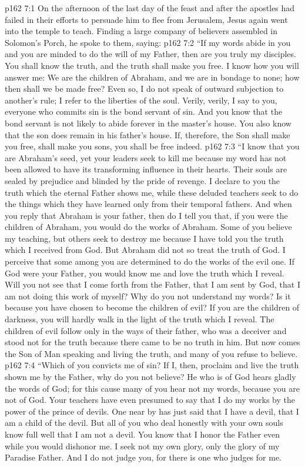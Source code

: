 \vs p162 7:1 On the afternoon of the last day of the feast and after the apostles had failed in their efforts to persuade him to flee from Jerusalem, Jesus again went into the temple to teach. Finding a large company of believers assembled in Solomon’s Porch, he spoke to them, saying:
\pc \vs p162 7:2 “If my words abide in you and you are minded to do the will of my Father, then are you truly my disciples. You shall know the truth, and the truth shall make you free. I know how you will answer me: We are the children of Abraham, and we are in bondage to none; how then shall we be made free? Even so, I do not speak of outward subjection to another’s rule; I refer to the liberties of the soul. Verily, verily, I say to you, everyone who commits sin is the bond servant of sin. And you know that the bond servant is not likely to abide forever in the master’s house. You also know that the son does remain in his father’s house. If, therefore, the Son shall make you free, shall make you sons, you shall be free indeed.
\vs p162 7:3 \textcolor{ubdarkred}{“I know that you are Abraham’s seed, yet your leaders seek to kill me because my word has not been allowed to have its transforming influence in their hearts. Their souls are sealed by prejudice and blinded by the pride of revenge. I declare to you the truth which the eternal Father shows me, while these deluded teachers seek to do the things which they have learned only from their temporal fathers. And when you reply that Abraham is your father, then do I tell you that, if you were the children of Abraham, you would do the works of Abraham. Some of you believe my teaching, but others seek to destroy me because I have told you the truth which I received from God. But Abraham did not so treat the truth of God. I perceive that some among you are determined to do the works of the evil one. If God were your Father, you would know me and love the truth which I reveal. Will you not see that I come forth from the Father, that I am sent by God, that I am not doing this work of myself? Why do you not understand my words? Is it because you have chosen to become the children of evil? If you are the children of darkness, you will hardly walk in the light of the truth which I reveal. The children of evil follow only in the ways of their father, who was a deceiver and stood not for the truth because there came to be no truth in him. But now comes the Son of Man speaking and living the truth, and many of you refuse to believe.}
\vs p162 7:4 \textcolor{ubdarkred}{“Which of you convicts me of sin? If I, then, proclaim and live the truth shown me by the Father, why do you not believe? He who is of God hears gladly the words of God; for this cause many of you hear not my words, because you are not of God. Your teachers have even presumed to say that I do my works by the power of the prince of devils. One near by has just said that I have a devil, that I am a child of the devil. But all of you who deal honestly with your own souls know full well that I am not a devil. You know that I honor the Father even while you would dishonor me. I seek not my own glory, only the glory of my Paradise Father. And I do not judge you, for there is one who judges for me.}
